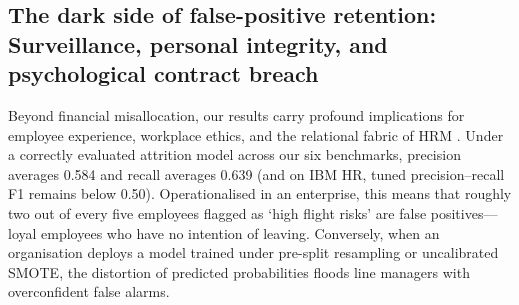 \documentclass[12pt,a4paper]{article}
\begin{document}
\subsection{The dark side of false-positive retention: Surveillance, personal integrity, and psychological contract breach}
\label{sec:darkside}
Beyond financial misallocation, our results carry profound implications for employee experience, workplace ethics, and the relational fabric of HRM \parencite{ref61,ref60,ref54,ref53}. Under a correctly evaluated attrition model across our six benchmarks, precision averages 0.584 and recall averages 0.639 (and on IBM HR, tuned precision--recall F1 remains below 0.50). Operationalised in an enterprise, this means that roughly two out of every five employees flagged as `high flight risks' are false positives---loyal employees who have no intention of leaving. Conversely, when an organisation deploys a model trained under pre-split resampling or uncalibrated SMOTE, the distortion of predicted probabilities \parencite{ref9,ref10} floods line managers with overconfident false alarms.
\end{document}
